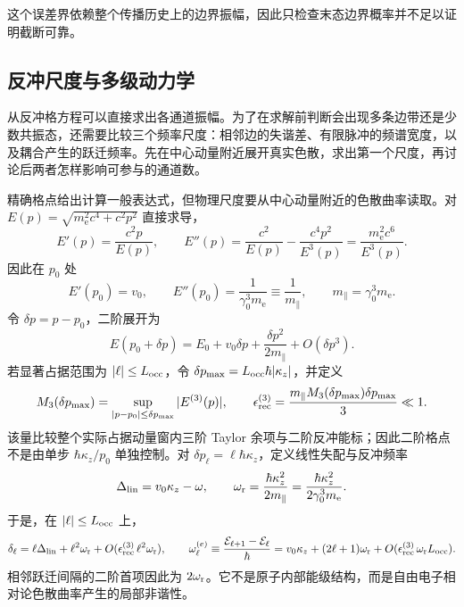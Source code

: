 这个误差界依赖整个传播历史上的边界振幅，因此只检查末态边界概率并不足以证明截断可靠。

\subsection{反冲尺度与多级动力学}\label{subsec:recoil-scales-multilevel-dp19}

从反冲格方程可以直接求出各通道振幅。为了在求解前判断会出现多条边带还是少数共振态，还需要比较三个频率尺度：相邻边的失谐差、有限脉冲的频谱宽度，以及耦合产生的跃迁频率。先在中心动量附近展开真实色散，求出第一个尺度，再讨论后两者怎样影响可参与的通道数。

精确格点给出计算一般表达式，但物理尺度要从中心动量附近的色散曲率读取。对
\(E(p)=\sqrt{m_{\mathrm e}^2c^4+c^2p^2}\) 直接求导，
\begin{equation*}
E'(p)=\frac{c^2p}{E(p)},
\qquad
E''(p)=\frac{c^2}{E(p)}-\frac{c^4p^2}{E^3(p)}
=\frac{m_{\mathrm e}^2c^6}{E^3(p)}.
\end{equation*}
因此在 $p_0$ 处
\begin{equation*}
E'(p_0)=v_0,
\qquad
E''(p_0)=\frac1{\gamma_0^3m_{\mathrm e}}
\equiv\frac1{m_\parallel},
\qquad
m_\parallel=\gamma_0^3m_{\mathrm e}.
\end{equation*}
令 $\delta p=p-p_0$，二阶展开为
\begin{equation*}
E(p_0+\delta p)
=E_0+v_0\delta p+\frac{\delta p^2}{2m_\parallel}+O(\delta p^3).
\end{equation*}
若显著占据范围为 $|\ell|\le L_{\rm occ}$，令 $\delta p_{\max}=L_{\rm occ}\hbar|\kappa_z|$，并定义
\begin{equation*}
 M_3(\delta p_{\max})
 =\sup_{|p-p_0|\le \delta p_{\max}}|E^{(3)}(p)|,
 \qquad
 \epsilon_{\rm rec}^{(3)}
 =\frac{m_\parallel M_3(\delta p_{\max})\delta p_{\max}}{3}\ll1.
\end{equation*}
该量比较整个实际占据动量窗内三阶 Taylor 余项与二阶反冲能标；因此二阶格点不是由单步 $\hbar \kappa_z/p_0$ 单独控制。对 $\delta p_\ell=\ell\hbar \kappa_z$，定义线性失配与反冲频率
\begin{equation}
{
\Delta_{\rm lin}=v_0\kappa_z-\omega,
\qquad
\omega_{\rm r}=\frac{\hbar \kappa_z^2}{2m_\parallel}
=\frac{\hbar \kappa_z^2}{2\gamma_0^3m_{\mathrm e}}.}
\label{eq:recoil_frequency}
\end{equation}
于是，在 $|\ell|\le L_{\rm occ}$ 上，
\begin{equation*}
\delta_\ell
= \ell\Delta_{\rm lin}+\ell^2\omega_{\rm r}
+O(\epsilon_{\rm rec}^{(3)}\,\ell^2\omega_{\rm r}),
\qquad
\omega_\ell^{(e)}\equiv\frac{\mathcal E_{\ell+1}-\mathcal E_\ell}{\hbar}
= v_0\kappa_z+(2\ell+1)\omega_{\rm r}
+O(\epsilon_{\rm rec}^{(3)}\,\omega_{\rm r}L_{\rm occ}).
\end{equation*}
相邻跃迁间隔的二阶首项因此为 $2\omega_{\rm r}$。它不是原子内部能级结构，而是自由电子相对论色散曲率产生的局部非谐性。

